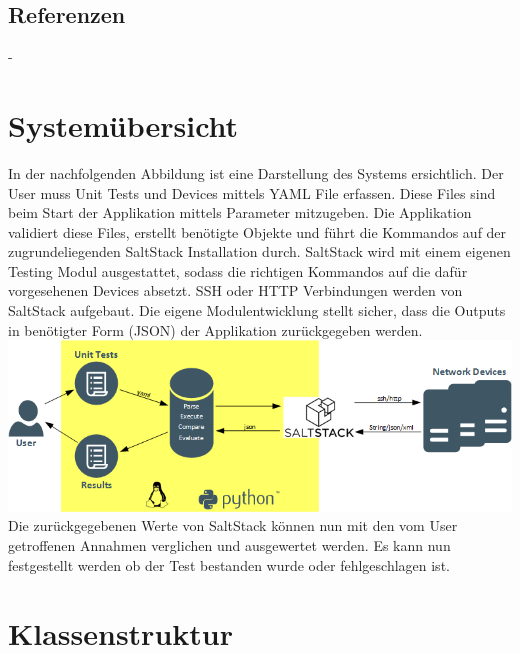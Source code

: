 \documentclass[a4,12pt]{scrartcl}
\begin{document}
\subsection{Referenzen}
\begin{description}
-
\end{description}
\newpage
\section{Systemübersicht}
In der nachfolgenden Abbildung ist eine Darstellung des Systems ersichtlich. Der User muss Unit Tests und Devices mittels YAML File erfassen. Diese Files sind beim Start der Applikation mittels Parameter mitzugeben. Die Applikation validiert diese Files, erstellt benötigte Objekte und führt die Kommandos auf der zugrundeliegenden SaltStack Installation durch. SaltStack wird mit einem eigenen Testing Modul ausgestattet, sodass die richtigen Kommandos auf die dafür vorgesehenen Devices absetzt. SSH oder HTTP Verbindungen werden von SaltStack aufgebaut. Die eigene Modulentwicklung stellt sicher, dass die Outputs in benötigter Form (JSON) der Applikation zurückgegeben werden. \\

\noindent \includegraphics[width=1.00\textwidth]{./pictures/systemuebersicht.png} \\

\noindent Die zurückgegebenen Werte von SaltStack können nun mit den vom User getroffenen Annahmen verglichen und ausgewertet werden. Es kann nun festgestellt werden ob der Test bestanden wurde oder fehlgeschlagen ist. 
\newpage
\section{Klassenstruktur}
\end{document}
